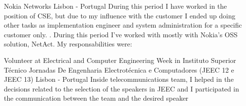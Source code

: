 \documentclass[12pt,a4paper, roman]{moderncv} %
\begin{document}
	{Nokia Networks}
	{Lisbon - Portugal}{}
	{
		During this period I have worked in the position of CSE, but due to my influence with the customer I
		ended up doing other tasks as implementation engineer and system administration for a specific customer
		only. . During this period I've worked with mostly with Nokia's OSS solution, NetAct. My
		responsabilities were:
}



	{Volunteer at Electrical and Computer Engineering Week in Instituto Superior Técnico}
	{Jornadas De Engenharia Electrotécnica e Computadores (JEEC 12 e JEEC 13)}
	{Lisbon - Portugal}{}
	{
		Inside telecommunications team, I helped in the decisions related to the
		selection of the speakers in JEEC and I participated in the communication between the team and the
		desired speaker
	}


\end{document}
